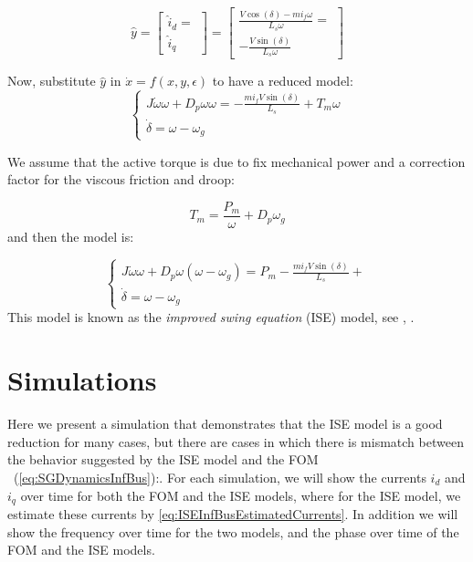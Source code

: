 \documentclass[conference]{IEEEtran}
\newcommand{\rfb}[1]{\mbox{\rm
   (\ref{#1})}\ifx\undefined\stillediting\else:\fbox{$#1$}\fi}
\begin{document}
\begin{equation}
\hat{y}=\left[\begin{array}{c}
\hat{i}_{d}=\\
\hat{i}_{q}
\end{array}\right]=\left[\begin{array}{c}
\frac{V\cos(\delta)-mi_{f}\omega}{L_{s}\omega}=\\
-\frac{V\sin(\delta)}{L_{s}\omega}
\end{array}\right]\label{eq:ISEInfBusEstimatedCurrents}
\end{equation}


Now, substitute $\hat{y}$ in $\dot{x}=f(x,y,\epsilon)$ to have a
reduced model:
\[
\left\{ \begin{array}{c}
J\dot{\omega}\omega+D_{p}\omega\omega=-\frac{mi_{f}V\sin(\delta)}{L_{s}}+T_{m}\omega\\
\dot{\delta}=\omega-\omega_{g}
\end{array}\right.
\]


We assume that the active torque is due to fix mechanical power and
a correction factor for the viscous friction and droop:

\[
T_{m}=\frac{P_{m}}{\omega}+D_{p}\omega_{g}
\]
and then the model is: 

\[
\left\{ \begin{array}{c}
J\dot{\omega}\omega+D_{p}\omega(\omega-\omega_{g})=P_{m}-\frac{mi_{f}V\sin(\delta)}{L_{s}}+\\
\dot{\delta}=\omega-\omega_{g}
\end{array}\right.
\]
This model is known as the {\em improved swing equation} (ISE) model,
see \cite{DePersiSchaft:16}, \cite{ZhouOhsawa2009}.

\section{Simulations}

Here we present a simulation that demonstrates that the ISE model is a good reduction for many cases, but there are cases
in which there is mismatch between the behavior suggested by the
ISE model and the FOM
\rfb{eq:SGDynamicsInfBus}. For each simulation, we will show the
currents $i_d$ and $i_q$ over time for both the FOM
and the ISE models, where for the ISE model, we estimate these currents by
\eqref{eq:ISEInfBusEstimatedCurrents}.  In addition we will show the
frequency over time for the two models, and the phase over time of the
FOM and the ISE models.
\end{document}
